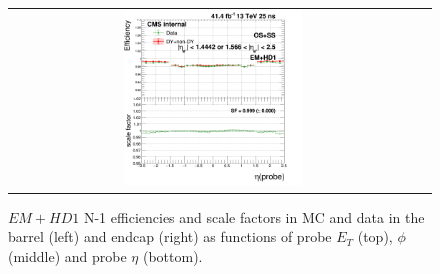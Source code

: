 \begin{figure}[bh]
\begin{center}
\begin{tabular}{cc}
      \includegraphics[width=0.45\textwidth]{figures/Zprime/2017/ScaleFactor/SameSign/N-1/g_compare_cut_eta_Barrel+Endcap_ea_ta_inc_AS_N_1_EMHD1Iso_PUW.png}
    \end{tabular}
    \caption{$EM+HD1$ N-1 efficiencies and scale factors in MC and data in the barrel (left) and endcap (right) as functions of probe $E_T$ (top), $\phi$ (middle) and probe $\eta$ (bottom).}
    \label{fig:EMHD1Iso_2017}
  \end{center}
\end{figure}


